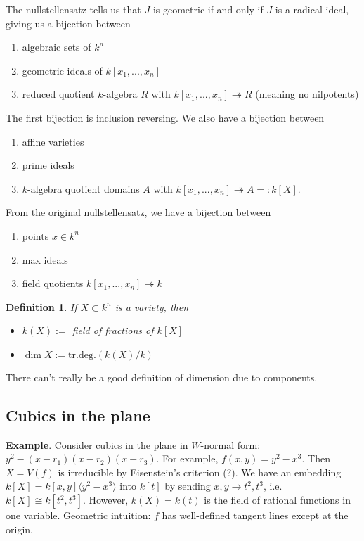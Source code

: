 \documentclass[letterpaper, 12pt]{article}
\newtheorem{definition}[thm]{Definition}
\newcommand{\iso}{\cong}
\newcommand{\polyring}[3]{#1[x_{#2}, ..., x_{#3}]}
\begin{document}
The nullstellensatz tells us that $J$ is geometric if and only if $J$ is a
radical ideal, giving us a bijection between \begin{enumerate} \item algebraic
sets of $k^n$ \item geometric ideals of $\polyring k 1 n$ \item reduced
quotient $k$-algebra $R$ with $\polyring k 1 n \twoheadrightarrow R$ (meaning
no nilpotents) \end{enumerate}

The first bijection is inclusion reversing.  We also have a bijection between
\begin{enumerate}
\item affine varieties
\item prime ideals
\item $k$-algebra quotient domains $A$ with $\polyring k 1 n \twoheadrightarrow A =: k[X]$.
\end{enumerate}

From the original nullstellensatz, we have a bijection between
\begin{enumerate}
\item points $x \in k^n$
\item max ideals
\item field quotients $\polyring k 1 n \twoheadrightarrow k$
\end{enumerate}

\begin{definition}
If $X \subset k^n$ is a variety, then
  \begin{itemize}
    \item $k(X) :=$ field of fractions of $k[X]$
    \item $\dim X := \mathrm{tr. deg.} (k(X)/k)$
  \end{itemize}
\end{definition}

There can't really be a good definition of dimension due to components.

\subsection{Cubics in the plane}

\textbf{Example}. Consider cubics in the plane in $W$-normal form: $y^2 - (x -
r_1)(x - r_2)(x - r_3)$. For example, $f(x,y) = y^2 - x^3$. Then $X = V(f)$
is irreducible by Eisenstein's criterion (?). We have an embedding $k[X] =
k[x,y] \langle y^2 - x^3 \rangle$ into $k[t]$ by sending $x, y \rightarrow t^2,
t^3$, i.e. $k[X] \iso k[t^2, t^3]$. However, $k(X) = k(t)$ is the field of
rational functions in one variable. Geometric intuition: $f$ has well-defined
tangent lines except at the origin.
\end{document}
